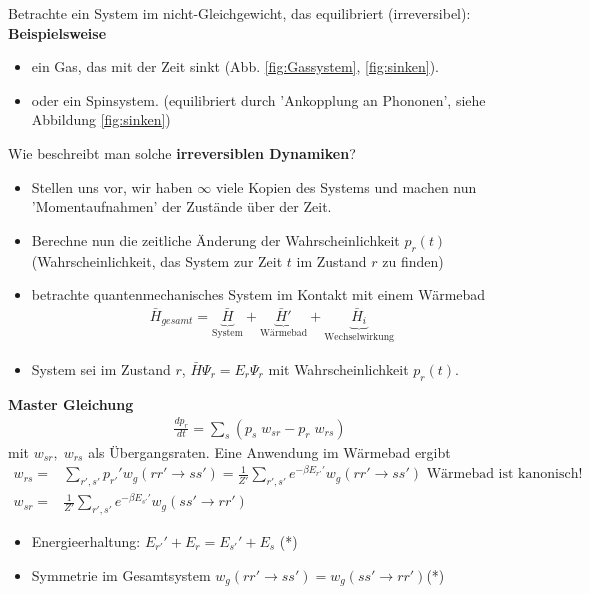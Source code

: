 \documentclass[12pt]{article}
\begin{document}
Betrachte ein System im nicht-Gleichgewicht, das equilibriert (irreversibel): 
\textbf{Beispielsweise}
\begin{itemize}
\item ein Gas, das mit der Zeit sinkt (Abb. \ref{fig:Gassystem}, \ref{fig:sinken}).
\item oder ein Spinsystem. (equilibriert durch 'Ankopplung an Phononen', siehe Abbildung \ref{fig:sinken})
\end{itemize}    
Wie beschreibt man solche \textbf{irreversiblen Dynamiken}?
\begin{itemize}
\item Stellen uns vor, wir haben $\infty$ viele Kopien des Systems und machen nun 'Momentaufnahmen' der Zustände über der Zeit. 
\item Berechne nun die zeitliche Änderung der Wahrscheinlichkeit $p_r(t)$ (Wahrscheinlichkeit, das System zur Zeit $t$ im Zustand $r$ zu finden)
\item betrachte quantenmechanisches System im Kontakt mit einem Wärmebad
\begin{align}
\bar{H}_{gesamt} = \underbrace{ \bar{H}}_\text{System} + \underbrace{\bar{H}'}_\text{Wärmebad} + \underbrace{ \bar{H}_i}_\text{Wechselwirkung}
\end{align}
\item System sei im Zustand $r$, $\bar{H} \Psi_r = E_r \Psi_r$ mit Wahrscheinlichkeit $p_r(t)$.
\end{itemize}
\textbf{Master Gleichung}
\begin{align}
\frac{dp_r}{dt}= \sum_s \left( p_s \; w_{sr}  - p_r \; w_{rs} \right) 
\end{align}
mit $ w_{sr}, \;  w_{rs}$ als Übergangsraten. Eine  Anwendung im Wärmebad ergibt
\begin{align}
w_{rs}= & \sum_{r',s'} p_{r'}' w_g(rr' \rightarrow ss') = \frac{1}{Z'} \sum_{r',s'}  e^{-\beta E_{r'}'} w_g (rr' \rightarrow ss') \mbox{ Wärmebad ist kanonisch! } \\
w_{sr}= & \frac{1}{Z'} \sum_{r',s'}  e^{-\beta E_{s'}'} w_g (ss' \rightarrow rr')
\end{align}
\begin{itemize}
\item Energieerhaltung: $E_{r'}' + E_r = E_{s'}' + E_s$ (*)
\item Symmetrie im Gesamtsystem $w_g (rr' \rightarrow ss') = w_g (ss' \rightarrow rr')$(*)
\end{itemize}
\end{document}
